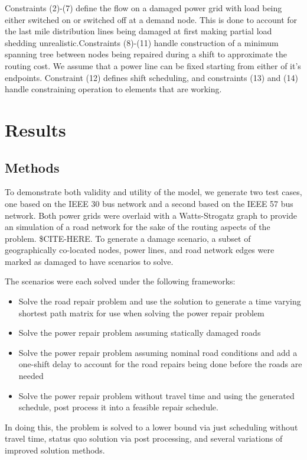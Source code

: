 \documentclass[10pt]{article}
\begin{document}
 Constraints (2)-(7) define the flow on a damaged power grid with load being either switched on or switched off at a demand node. This is done to account for the last mile distribution lines being damaged at first making partial load shedding unrealistic.Constraints (8)-(11) handle construction of a minimum spanning tree between nodes being repaired during a shift to approximate the routing cost. We assume that a power line can be fixed starting from either of it's endpoints. Constraint (12) defines shift scheduling, and constraints (13) and (14) handle constraining operation to elements that are working.
\section{\large{Results}}
\vspace*{-12pt}
\subsection{Methods}
 \vspace*{-12pt}
 
 To demonstrate both validity and utility of the model, we generate two test cases, one based on the IEEE 30 bus network and a second based on the IEEE 57 bus network. Both power grids were overlaid with a Watts-Strogatz graph to provide an simulation of a road network for the sake of the routing aspects of the problem. \$CITE-HERE. To generate a damage scenario, a subset of geographically co-located nodes, power lines, and road network edges were marked as damaged to have scenarios to solve.
 
 The scenarios were each solved under the following frameworks:
 \begin{itemize}
 	\item Solve the road repair problem and use the solution to generate a time varying shortest path matrix for use when solving the power repair problem
 	\item Solve the power repair problem assuming statically damaged roads
 	\item Solve the power repair problem assuming nominal road conditions and add a one-shift delay to account for the road repairs being done before the roads are needed
 	\item Solve the power repair problem without travel time and using the generated schedule, post process it into a feasible repair schedule.
 \end{itemize}

In doing this, the problem is solved to a lower bound via just scheduling without travel time, status quo solution via post processing, and several variations of improved solution methods.
\end{document}
